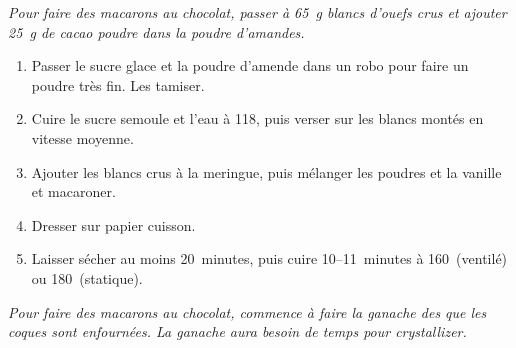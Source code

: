 


\begin{ingredients}
\end{ingredients}

{\it Pour faire des macarons au chocolat, passer \`a 65~g blancs
  d'ouefs crus et ajouter 25~g de cacao poudre dans la poudre
  d'amandes.}

\begin{recipe}
  \begin{enumerate}

  \item Passer le sucre glace et la poudre d'amende dans un robo pour
    faire un poudre tr\`es fin.  Les tamiser.

  \item Cuire le sucre semoule et l'eau \`a 118\C, puis verser sur les
    blancs mont\'es en vitesse moyenne.

  \item Ajouter les blancs crus \`a la meringue, puis m\'elanger les
    poudres et la vanille et macaroner.

  \item Dresser sur papier cuisson.

  \item Laisser s\'echer au moins 20~minutes, puis cuire
    10--11~minutes \`a 160\C\ (ventil\'e) ou 180\C\ (statique).
  \end{enumerate}
\end{recipe}

{\it Pour faire des macarons au chocolat, commence à faire la ganache
  des que les coques sont enfournées.  La ganache aura besoin de temps
  pour crystallizer.}


\begin{ingredients}
\end{ingredients}



